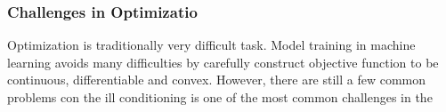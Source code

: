 \subsubsection{Challenges in Optimizatio}

Optimization is traditionally very difficult task. Model training in machine learning avoids many difficulties by carefully construct objective function to be continuous, differentiable and convex. However, there are still a few common problems con
the ill conditioning is one of the most common challenges in the 